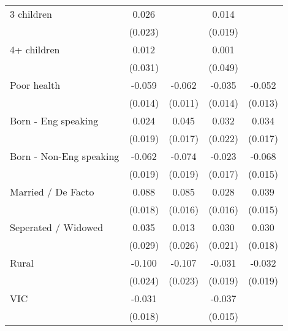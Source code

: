 {\begin{tabular}{l*{4}{c}}
3 children          &       0.026         &                     &       0.014         &                     \\
                    &     (0.023)         &                     &     (0.019)         &                     \\
4+ children         &       0.012         &                     &       0.001         &                     \\
                    &     (0.031)         &                     &     (0.049)         &                     \\
Poor health         &      -0.059\sym{***}&      -0.062\sym{***}&      -0.035\sym{**} &      -0.052\sym{***}\\
                    &     (0.014)         &     (0.011)         &     (0.014)         &     (0.013)         \\
Born - Eng speaking &       0.024         &       0.045\sym{***}&       0.032         &       0.034\sym{**} \\
                    &     (0.019)         &     (0.017)         &     (0.022)         &     (0.017)         \\
Born - Non-Eng speaking&      -0.062\sym{***}&      -0.074\sym{***}&      -0.023         &      -0.068\sym{***}\\
                    &     (0.019)         &     (0.019)         &     (0.017)         &     (0.015)         \\
Married / De Facto  &       0.088\sym{***}&       0.085\sym{***}&       0.028\sym{*}  &       0.039\sym{***}\\
                    &     (0.018)         &     (0.016)         &     (0.016)         &     (0.015)         \\
Seperated / Widowed &       0.035         &       0.013         &       0.030         &       0.030         \\
                    &     (0.029)         &     (0.026)         &     (0.021)         &     (0.018)         \\
Rural               &      -0.100\sym{***}&      -0.107\sym{***}&      -0.031         &      -0.032\sym{*}  \\
                    &     (0.024)         &     (0.023)         &     (0.019)         &     (0.019)         \\
VIC                 &      -0.031\sym{*}  &                     &      -0.037\sym{**} &                     \\
                    &     (0.018)         &                     &     (0.015)         &                     \\

\end{tabular}}

